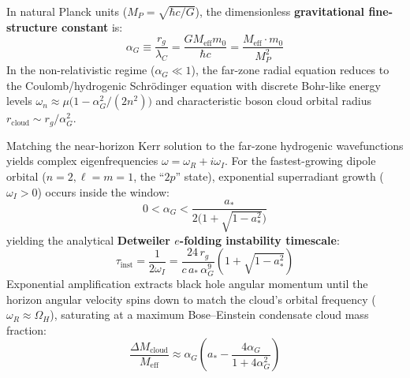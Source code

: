 \documentclass[11pt,a4paper]{article}
\begin{document}
In natural Planck units ($M_P = \sqrt{\hbar c / G}$), the dimensionless \textbf{gravitational fine-structure constant} is:
\begin{equation}
\alpha_G \equiv \frac{r_g}{\lambda_C} = \frac{G M_{\text{eff}} m_0}{\hbar c} = \frac{M_{\text{eff}} \cdot m_0}{M_P^2}
\end{equation}
In the non-relativistic regime ($\alpha_G \ll 1$), the far-zone radial equation reduces to the Coulomb/hydrogenic Schr\"odinger equation with discrete Bohr-like energy levels $\omega_n \approx \mu\big(1 - \alpha_G^2 / (2n^2)\big)$ and characteristic boson cloud orbital radius $r_{\text{cloud}} \sim r_g / \alpha_G^2$.

Matching the near-horizon Kerr solution to the far-zone hydrogenic wavefunctions yields complex eigenfrequencies $\omega = \omega_R + i\omega_I$. For the fastest-growing dipole orbital ($n = 2, \ell = m = 1$, the ``$2p$'' state), exponential superradiant growth ($\omega_I > 0$) occurs inside the window:
\begin{equation}
0 < \alpha_G < \frac{a_*}{2\big(1 + \sqrt{1 - a_*^2}\big)}
\end{equation}
yielding the analytical \textbf{Detweiler $e$-folding instability timescale}:
\begin{equation}
\tau_{\text{inst}} = \frac{1}{2\omega_I} = \frac{24\,r_g}{c\,a_*\,\alpha_G^9}\left(1 + \sqrt{1 - a_*^2}\right)
\end{equation}
Exponential amplification extracts black hole angular momentum until the horizon angular velocity spins down to match the cloud's orbital frequency ($\omega_R \approx \Omega_H$), saturating at a maximum Bose--Einstein condensate cloud mass fraction:
\begin{equation}
\frac{\Delta M_{\text{cloud}}}{M_{\text{eff}}} \approx \alpha_G\left(a_* - \frac{4\alpha_G}{1 + 4\alpha_G^2}\right)
\end{equation}
\end{document}
